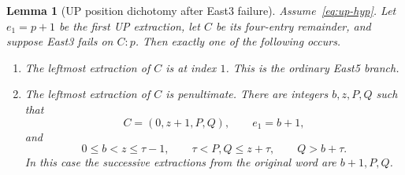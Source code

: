 \documentclass[11pt]{article}
\newtheorem{lemma}[theorem]{Lemma}
\theoremstyle{definition}
\theoremstyle{remark}
\begin{document}
\begin{lemma}[UP position dichotomy after East3 failure]
\label{lem:up-boundary-classification}
Assume~\eqref{eq:up-hyp}.  Let $e_1=p+1$ be the first UP extraction, let
$C$ be its four-entry remainder, and suppose East3 fails on $C:p$.
Then exactly one of the following occurs.
\begin{enumerate}
\item The leftmost extraction of $C$ is at index $1$.  This is the ordinary
East5 branch.
\item The leftmost extraction of $C$ is penultimate.  There are integers
$b,z,P,Q$ such that
\begin{equation}
 C=(0,z+1,P,Q),
 \qquad e_1=b+1,
 \label{eq:up-boundary-shape}
\end{equation}
and
\begin{equation}
 0\le b<z\le\tau-1,
 \qquad
 \tau<P,Q\le z+\tau,
 \qquad
 Q>b+\tau.
 \label{eq:boundary-data}
\end{equation}
In this case the successive extractions from the original word are
$b+1,P,Q$.
\end{enumerate}
\end{lemma}
\end{document}
